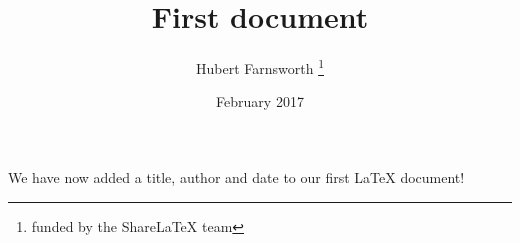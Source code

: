 \documentclass[12pt, letterpaper, twoside]{article}
\title{First document}
\author{Hubert Farnsworth \thanks{funded by the ShareLaTeX team}}
\date{February 2017}
\begin{document}
 
\maketitle
 
We have now added a title, author and date to our first \LaTeX{} document!
 
\end{document}
